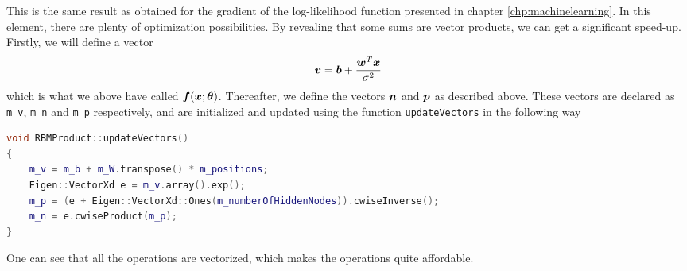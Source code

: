 This is the same result as obtained for the gradient of the log-likelihood function presented in chapter \ref{chp:machinelearning}. In this element, there are plenty of optimization possibilities. By revealing that some sums are vector products, we can get a significant speed-up. Firstly, we will define a vector 
\begin{equation}
\boldsymbol{{v}}=\boldsymbol{{b}}+\frac{\boldsymbol{{w}}^T\boldsymbol{{x}}}{\sigma^2}
\end{equation}
which is what we above have called $\boldsymbol{{f}}(\boldsymbol{{x}};\boldsymbol{{\theta}})$. Thereafter, we define the vectors $\boldsymbol{{n}}$ and $\boldsymbol{{p}}$ as described above. These vectors are declared as \lstinline|m_v|, \lstinline|m_n| and \lstinline|m_p| respectively, and are initialized and updated using the function \lstinline|updateVectors| in the following way

\begin{lstlisting}[language={c++},caption={Taken from \lstinline|rbmproduct.cpp|.}]
void RBMProduct::updateVectors()
{
	m_v = m_b + m_W.transpose() * m_positions;
	Eigen::VectorXd e = m_v.array().exp();
	m_p = (e + Eigen::VectorXd::Ones(m_numberOfHiddenNodes)).cwiseInverse();
	m_n = e.cwiseProduct(m_p);
}
\end{lstlisting}
One can see that all the operations are vectorized, which makes the operations quite affordable. 

